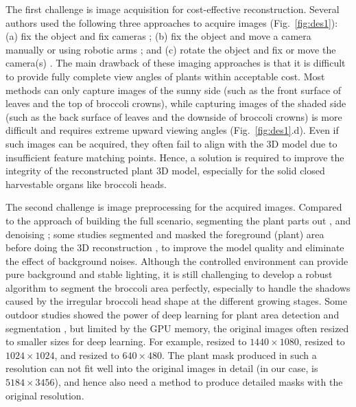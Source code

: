 The first challenge is image acquisition for cost-effective reconstruction. Several authors used the following three approaches to acquire images (Fig.~\ref{fig:des1}): (a) fix the object and fix cameras \citep{nguyen_structured_2015}; (b) fix the object and move a camera manually \citep{xiao_image-based_2020} or using robotic arms \citep{cao_quantifying_2019,nguyen_3d_2016}; and (c) rotate the object and fix or move the camera(s) \citep{kochi_3d_2018,gao_novel_2021}. The main drawback of these imaging approaches is that it is difficult to provide fully complete view angles of plants within acceptable cost. Most methods can only capture images of the sunny side (such as the front surface of leaves and the top of broccoli crowns), while capturing images of the shaded side (such as the back surface of leaves and the downside of broccoli crowns) is more difficult and requires extreme upward viewing angles (Fig.~\ref{fig:des1}.d). Even if such images can be acquired, they often fail to align with the 3D model due to insufficient feature matching points. Hence, a solution is required to improve the integrity of the reconstructed plant 3D model, especially for the solid closed harvestable organs like broccoli heads.

The second challenge is image preprocessing for the acquired images. Compared to the approach of building the full scenario, segmenting the plant parts out \citep{ge_method_2019}, and denoising \citep{wu_mvs-pheno_2020}; some studies segmented and masked the foreground (plant) area before doing the 3D reconstruction \citep{nguyen_3d_2016,kochi_3d_2018}, to improve the model quality and eliminate the effect of background noises. Although the controlled environment can provide pure background and stable lighting, it is still challenging to develop a robust algorithm to segment the broccoli area perfectly, especially to handle the shadows caused by the irregular broccoli head shape at the different growing stages. Some outdoor studies showed the power of deep learning for plant area detection and segmentation \citep{zhou_monitoring_2020,blok_effect_2021,garcia_towards_2021}, but limited by the GPU memory, the original images often resized to smaller sizes for deep learning. For example, \citet{zhou_monitoring_2020} resized to $1440 \times 1080$, \citet{blok_effect_2021} resized to $1024 \times 1024$, and \citet{garcia_towards_2021} resized to $640 \times 480$. The plant mask produced in such a resolution can not fit well into the original images in detail (in our case, is $5184 \times 3456$), and hence also need a method to produce detailed masks with the original resolution.

